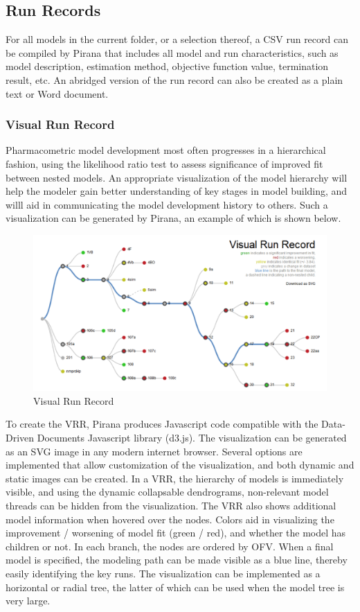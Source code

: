 {{{{\subsection{Run Records}
For all models in the current folder, or a selection thereof, a CSV
run record can be compiled by Pirana that includes all
model and run characteristics, such as model description, estimation
method, objective function value, termination result, etc. An abridged
version of the run record can also be created as a plain text or Word
document.

\subsubsection*{Visual Run Record}
Pharmacometric model development most often progresses in a
hierarchical fashion, using the likelihood ratio test to assess
significance of improved fit between nested models. An appropriate
visualization of the model hierarchy will help the modeler gain better
understanding of key stages in model building, and willl aid in
communicating the model development history to others. Such a
visualization can be generated by Pirana, an example of which is shown below.

\begin{figure}[H] \centering
    \includegraphics[scale=0.47]{images/vrr.png}
    \caption{Visual Run Record}
\end{figure}

\noindent To create the VRR, Pirana produces Javascript code compatible with the Data-Driven
Documents Javascript library (d3.js). The visualization can be
generated as an SVG image in any modern internet browser. Several
options are implemented that allow customization of the visualization,
and both dynamic and static images can be created. In a VRR, the
hierarchy of models is immediately visible, and using the dynamic
collapsable dendrograms, non-relevant model threads can be hidden from
the visualization. The VRR also shows additional model information
when hovered over the nodes. Colors aid in visualizing the improvement
/ worsening of model fit (green / red), and whether the model has
children or not. In each branch, the nodes are ordered by OFV. When a
final model is specified, the modeling path can be made visible as a
blue line, thereby easily identifying the key runs. The visualization
can be implemented as a horizontal or radial tree, the latter of which
can be used when the model tree is very large.

}}}}

